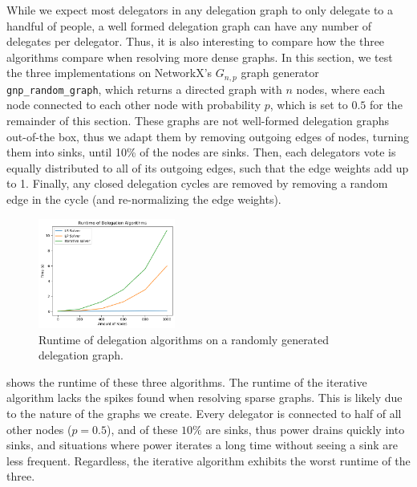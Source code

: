 While we expect most delegators in any delegation graph to only delegate to a handful of people, a well formed delegation graph can have any number of delegates per delegator. Thus, it is also interesting to compare how the three algorithms compare when resolving more dense graphs. In this section, we test the three implementations on NetworkX's $G_{n,p}$ graph generator \texttt{gnp\_random\_graph}, which returns a directed graph with $n$ nodes, where each node connected to each other node with probability $p$, which is set to $0.5$ for the remainder of this section. These graphs are not well-formed delegation graphs out-of-the box, thus we adapt them by removing outgoing edges of nodes, turning them into sinks, until 10\% of the nodes are sinks. Then, each delegators vote is equally distributed to all of its outgoing edges, such that the edge weights add up to 1. Finally, any closed delegation cycles are removed by removing a random edge in the cycle (and re-normalizing the edge weights). 


\begin{figure}[h]
    \centering
    \includegraphics[width=0.4\textwidth]{0-1000_dense}
    \caption{Runtime of delegation algorithms on a randomly generated delegation graph.}
    \label{fig:dense-small}
\end{figure}

 shows the runtime of these three algorithms. The runtime of the iterative algorithm lacks the spikes found when resolving sparse graphs. This is likely due to the nature of the graphs we create. Every delegator is connected to half of all other nodes ($p = 0.5$), and of these $10\%$ are sinks, thus power drains quickly into sinks, and situations where power iterates a long time without seeing a sink are less frequent. Regardless, the iterative algorithm exhibits the worst runtime of the three. 

